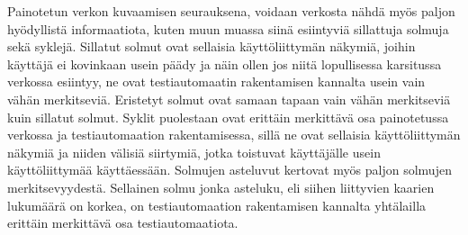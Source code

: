  Painotetun verkon kuvaamisen seurauksena, voidaan verkosta nähdä myös paljon hyödyllistä informaatiota, kuten muun muassa siinä esiintyviä sillattuja solmuja sekä syklejä.
  Sillatut solmut ovat sellaisia käyttöliittymän näkymiä, joihin käyttäjä ei kovinkaan usein päädy ja näin ollen jos niitä lopullisessa karsitussa verkossa esiintyy, ne ovat testiautomaatin rakentamisen kannalta usein vain vähän merkitseviä.
  Eristetyt solmut ovat samaan tapaan vain vähän merkitseviä kuin sillatut solmut.
  Syklit puolestaan ovat erittäin merkittävä osa painotetussa verkossa ja testiautomaation rakentamisessa, sillä ne ovat sellaisia käyttöliittymän näkymiä ja niiden välisiä siirtymiä, jotka toistuvat käyttäjälle usein käyttöliittymää käyttäessään.
  Solmujen asteluvut kertovat myös paljon solmujen merkitsevyydestä.
  Sellainen solmu jonka asteluku, eli siihen liittyvien kaarien lukumäärä on korkea, on testiautomaation rakentamisen kannalta yhtälailla erittäin merkittävä osa testiautomaatiota.
